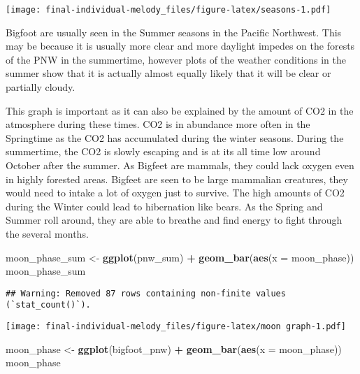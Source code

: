 \documentclass[
]{article}
\newenvironment{Shaded}{\begin{snugshade}}{\end{snugshade}}
\newcommand{\AttributeTok}[1]{\textcolor[rgb]{0.13,0.29,0.53}{#1}}
\newcommand{\FunctionTok}[1]{\textcolor[rgb]{0.13,0.29,0.53}{\textbf{#1}}}
\newcommand{\NormalTok}[1]{#1}
\newcommand{\OtherTok}[1]{\textcolor[rgb]{0.56,0.35,0.01}{#1}}
\newcommand{\SpecialCharTok}[1]{\textcolor[rgb]{0.81,0.36,0.00}{\textbf{#1}}}
\begin{document}
\texttt{[image: final-individual-melody\_files/figure-latex/seasons-1.pdf]}

Bigfoot are usually seen in the Summer seasons in the Pacific Northwest.
This may be because it is usually more clear and more daylight impedes
on the forests of the PNW in the summertime, however plots of the
weather conditions in the summer show that it is actually almost equally
likely that it will be clear or partially cloudy.

This graph is important as it can also be explained by the amount of CO2
in the atmosphere during these times. CO2 is in abundance more often in
the Springtime as the CO2 has accumulated during the winter seasons.
During the summertime, the CO2 is slowly escaping and is at its all time
low around October after the summer. As Bigfeet are mammals, they could
lack oxygen even in highly forested areas. Bigfeet are seen to be large
mammalian creatures, they would need to intake a lot of oxygen just to
survive. The high amounts of CO2 during the Winter could lead to
hibernation like bears. As the Spring and Summer roll around, they are
able to breathe and find energy to fight through the several months.

\begin{Shaded}
\begin{Highlighting}[]
\NormalTok{moon\_phase\_sum }\OtherTok{\textless{}{-}} \FunctionTok{ggplot}\NormalTok{(pnw\_sum) }\SpecialCharTok{+} \FunctionTok{geom\_bar}\NormalTok{(}\FunctionTok{aes}\NormalTok{(}\AttributeTok{x =}\NormalTok{ moon\_phase))}
\NormalTok{moon\_phase\_sum}
\end{Highlighting}
\end{Shaded}

\begin{verbatim}
## Warning: Removed 87 rows containing non-finite values (`stat_count()`).
\end{verbatim}

\texttt{[image: final-individual-melody\_files/figure-latex/moon graph-1.pdf]}

\begin{Shaded}
\begin{Highlighting}[]
\NormalTok{moon\_phase }\OtherTok{\textless{}{-}} \FunctionTok{ggplot}\NormalTok{(bigfoot\_pnw) }\SpecialCharTok{+} \FunctionTok{geom\_bar}\NormalTok{(}\FunctionTok{aes}\NormalTok{(}\AttributeTok{x =}\NormalTok{ moon\_phase))}
\NormalTok{moon\_phase}
\end{Highlighting}
\end{Shaded}
\end{document}
